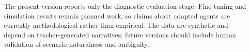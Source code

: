 \documentclass[11pt]{article}
\begin{document}
The present version reports only the diagnostic evaluation stage.
Fine-tuning and simulation results remain planned work, so claims about adapted agents are currently methodological rather than empirical.
The data are synthetic and depend on teacher-generated narratives; future versions should include human validation of scenario naturalness and ambiguity.



\appendix
\setcounter{table}{0}
\setcounter{figure}{0}
\renewcommand{\thetable}{S\arabic{table}}
\renewcommand{\thefigure}{S\arabic{figure}}

\end{document}
